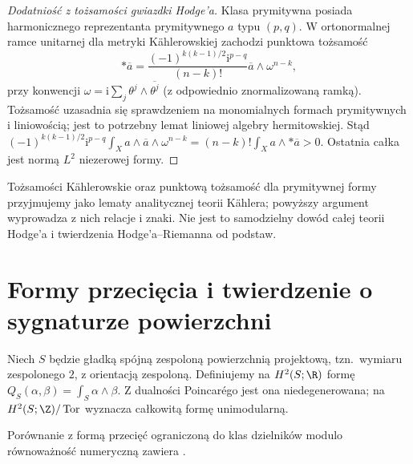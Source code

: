 \begin{proof}[Dodatniość z tożsamości gwiazdki Hodge'a]
Klasa prymitywna posiada harmonicznego reprezentanta
prymitywnego $a$ typu $(p,q)$. W ortonormalnej ramce
unitarnej dla metryki Kählerowskiej zachodzi punktowa
tożsamość
\[
*\overline a=
\frac{(-1)^{k(k-1)/2}\mathrm i^{p-q}}{(n-k)!}
\overline a\wedge\omega^{n-k},
\]
przy konwencji $\omega=\mathrm i\sum_j\theta^j\wedge
\overline{\theta^j}$ (z odpowiednio znormalizowaną ramką).
Tożsamość uzasadnia się sprawdzeniem na monomialnych
formach prymitywnych i liniowością; jest to potrzebny
lemat liniowej algebry hermitowskiej. Stąd
$(-1)^{k(k-1)/2}\mathrm i^{p-q}\int_X a\wedge
\overline a\wedge\omega^{n-k}=(n-k)!\int_X a\wedge *\overline a>0$.
Ostatnia całka jest normą $L^2$ niezerowej formy.
\end{proof}
\begin{uwaga}
Tożsamości Kählerowskie oraz punktową tożsamość dla
prymitywnej formy przyjmujemy jako lematy analitycznej
teorii Kählera; powyższy argument wyprowadza z nich
relacje i znaki. Nie jest to samodzielny dowód całej
teorii Hodge'a i twierdzenia Hodge'a--Riemanna od podstaw.
\end{uwaga}

\section{Formy przecięcia i twierdzenie o sygnaturze powierzchni}
\begin{definicja}
Niech $S$ będzie gładką spójną zespoloną
powierzchnią projektową, tzn.\ wymiaru zespolonego $2$,
z orientacją zespoloną.
Definiujemy na $H^2(S;\R)$ formę
$Q_S(\alpha,\beta)=\int_S\alpha\wedge\beta$.
Z dualności Poincarégo jest ona niedegenerowana;
na $H^2(S;\Z)/\operatorname{Tor}$ wyznacza całkowitą
formę unimodularną.
\end{definicja}
Porównanie z formą przecięć ograniczoną do klas dzielników modulo równoważność numeryczną zawiera .

